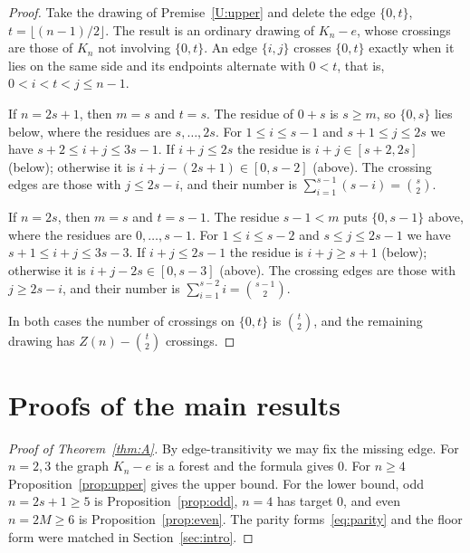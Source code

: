 \documentclass[11pt,a4paper]{article}
\theoremstyle{definition}
\theoremstyle{remark}
\numberwithin{equation}{section}
\begin{document}
\begin{proof}
Take the drawing of Premise~\ref{U:upper} and delete the edge $\{0,t\}$, $t=\lfloor(n-1)/2\rfloor$. The result is an ordinary drawing of $K_n-e$, whose crossings are those of $K_n$ not involving $\{0,t\}$. An edge $\{i,j\}$ crosses $\{0,t\}$ exactly when it lies on the same side and its endpoints alternate with $0<t$, that is, $0<i<t<j\le n-1$.

If $n=2s+1$, then $m=s$ and $t=s$. The residue of $0+s$ is $s\ge m$, so $\{0,s\}$ lies below, where the residues are $s,\dots,2s$. For $1\le i\le s-1$ and $s+1\le j\le 2s$ we have $s+2\le i+j\le 3s-1$. If $i+j\le2s$ the residue is $i+j\in[s+2,2s]$ (below); otherwise it is $i+j-(2s+1)\in[0,s-2]$ (above). The crossing edges are those with $j\le 2s-i$, and their number is $\sum_{i=1}^{s-1}(s-i)=\binom s2$.

If $n=2s$, then $m=s$ and $t=s-1$. The residue $s-1<m$ puts $\{0,s-1\}$ above, where the residues are $0,\dots,s-1$. For $1\le i\le s-2$ and $s\le j\le2s-1$ we have $s+1\le i+j\le 3s-3$. If $i+j\le 2s-1$ the residue is $i+j\ge s+1$ (below); otherwise it is $i+j-2s\in[0,s-3]$ (above). The crossing edges are those with $j\ge2s-i$, and their number is $\sum_{i=1}^{s-2}i=\binom{s-1}2$.

In both cases the number of crossings on $\{0,t\}$ is $\binom t2$, and the remaining drawing has $Z(n)-\binom t2$ crossings.
\end{proof}

\section{Proofs of the main results}\label{sec:proofs}

\begin{proof}[Proof of Theorem~\ref{thm:A}]
By edge-transitivity we may fix the missing edge. For $n=2,3$ the graph $K_n-e$ is a forest and the formula gives $0$. For $n\ge4$ Proposition~\ref{prop:upper} gives the upper bound. For the lower bound, odd $n=2s+1\ge5$ is Proposition~\ref{prop:odd}, $n=4$ has target $0$, and even $n=2M\ge6$ is Proposition~\ref{prop:even}. The parity forms~\eqref{eq:parity} and the floor form were matched in Section~\ref{sec:intro}.
\end{proof}
\end{document}
